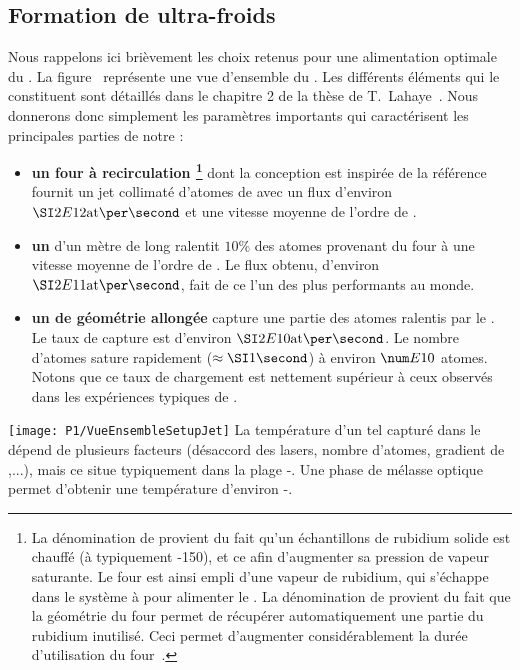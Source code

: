 	\subsection{Formation de \pats ultra-froids}\label{sec:PaquetsPmo}
Nous rappelons ici brièvement les choix retenus pour une alimentation optimale du \pmo. 
La figure~ représente une vue d'ensemble du \setup. Les différents éléments qui le constituent sont détaillés dans le chapitre 2 de la thèse de T.~Lahaye~\cite{TTL}. 
Nous donnerons donc simplement les paramètres importants qui caractérisent les principales parties de notre \setup:
	\begin{itemize}
	\item \textbf{un four à recirculation%
	\footnote{La dénomination de  provient du fait qu'un échantillons de rubidium solide est chauffé (à typiquement -\SI{150}{\degreecelsius}), et ce afin d'augmenter sa pression de vapeur saturante. Le four est ainsi empli d'une vapeur de rubidium, qui s'échappe dans le système à \uv pour alimenter le \pmo. La dénomination de  provient du fait que la géométrie du four permet de récupérer automatiquement une partie du rubidium inutilisé. Ceci permet d'augmenter considérablement la durée d'utilisation du four~\cite{TTL}.}%
} dont la conception est inspirée de la référence~\cite{CaP78} fournit un jet collimaté d'atomes de \Rb avec un flux d'environ $\atparsec{2E12}$ et une vitesse moyenne de l'ordre de .
	\item \textbf{un \ZS}\cite{PhM82,PPM82,PMP85} d'un mètre de long ralentit $10\%$ des atomes provenant du four à une vitesse moyenne de l'ordre de . Le flux obtenu, d'environ $\atparsec{2E{11}}$, fait de ce \ZS l'un des plus performants au monde.
	\item \textbf{un \pmo de géométrie allongée} capture une partie des atomes ralentis par le \ZS. Le taux de capture est d'environ $\atparsec{2E10}$. Le nombre d'atomes sature rapidement ($\approx\seconde{1}$) à environ $\val{E10}$ atomes. Notons que ce taux de chargement est nettement supérieur à ceux observés dans les expériences typiques de \condbe.
\end{itemize}
%
\bfigh
\texttt{[image: P1/VueEnsembleSetupJet]}
\label{fig:VueEnsembleSetupJet}
\efigh
%
La température d'un tel \pat capturé dans le \pmo dépend de plusieurs facteurs (désaccord des lasers, nombre d'atomes, gradient de \chm,...), mais ce situe typiquement dans la plage -. Une phase de mélasse optique permet d'obtenir une température d'environ -.


